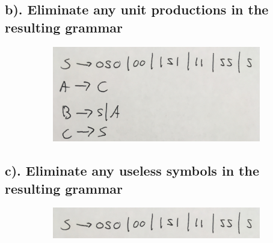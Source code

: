 \documentclass[20pt]{article} %
\begin{document}
\subsection{b). Eliminate any unit productions in the resulting grammar}
\begin{figure}[!htbp]
  	\centering
   	\begin{subfigure}[p]{0.5\linewidth}
    	\includegraphics[width=\linewidth]{./figures/h8-2.jpg}
   	\end{subfigure}
\end{figure}
\newpage
\subsection{c). Eliminate any useless symbols in the resulting grammar}
\begin{figure}[!htbp]
  	\centering
   	\begin{subfigure}[p]{0.5\linewidth}
    	\includegraphics[width=\linewidth]{./figures/h8-3.jpg}
   	\end{subfigure}
\end{figure}
\end{document}
